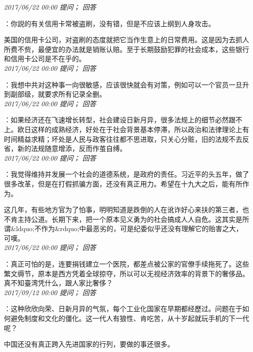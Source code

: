 \documentclass[twocolumn]{ctexart}
\begin{document}
\textit{\hfill\noindent\small 2017/06/22 00:00 提问； 回答}

：你説的有关信用卡常被盗刷，没有错，但是不应该上纲到人身攻击。

美国的信用卡公司，对盗刷的态度就把它当作生意上的日常费用。这是因为去抓人所费不赀，最便宜的办法就是销账认赔。至于长期鼓励犯罪的社会成本，这些银行和信用卡公司是不在乎的。\\

\textit{\hfill\noindent\small 2017/06/22 00:00 提问； 回答}

：我想中共对这种事一向很敏感，应该很快就会有对策，例如可以一个官员一旦升到副部级，就要求所有记录全删。\\

\textit{\hfill\noindent\small 2017/06/22 00:00 提问； 回答}

：如果经济还在飞速增长转型，社会建设日新月异，很多法规上的细节必然跟不上。欧日这样的成熟经济，好处在于社会背景基本停滞，所以政治和法律理论上有时间精益求精；坏处是人民与政客往往都不思进取，只关心分赃，旧的法规不去反省，新的法规随意增添，反而作茧自缚。\\

\textit{\hfill\noindent\small 2017/06/22 00:00 提问； 回答}

：我觉得维持并发展一个社会的道德系统，是政府的责任。习近平的头五年，做了很多改革，但是在打假抓骗方面，还没有真正用力。希望在十九大之后，能有所作为。

这几年，有些地方官为了怕事，明明知道是跌倒的人在讹诈好心来扶的第三者，也不肯主持公道。长期下来，把一个原本见义勇为的社会搞成人人自危。这其实是所谓\&ldquo;不作为\&rdquo;中最恶劣的，可是纪委似乎还没有理解它的贻害之大，可嘆。\\

\textit{\hfill\noindent\small 2017/06/22 00:00 提问； 回答}

：真正可怕的是，连要捐钱建立一个医院，都差点被公家的官僚手续拖死了。这些繁文缛节，原本是西方凭着全球掠夺，所以可以无视经济效率的背景下的奢侈品。真不知臺湾凭什么，跟人家比奢侈？\\

\textit{\hfill\noindent\small 2017/09/12 00:00 提问； 回答}

：这种欣欣向荣、日新月异的气氛，每个工业化国家在早期都经歷过。问题在于如何避免制度和文化的僵化。这一代人有狼性、肯吃苦，从十岁起就玩手机的下一代呢？

中国还没有真正跨入先进国家的行列，要做的事还很多。\\
\end{document}
